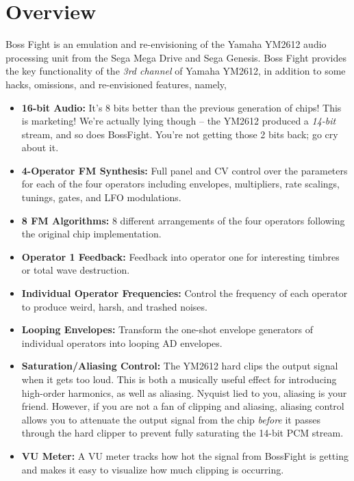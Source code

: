 \documentclass[12pt,letter]{article}
\begin{document}


\section*{Overview}

Boss Fight is an emulation and re-envisioning of the Yamaha YM2612 audio processing unit from the Sega Mega Drive and Sega Genesis. Boss Fight provides the key functionality of the \textit{3rd channel} of Yamaha YM2612, in addition to some hacks, omissions, and re-envisioned features, namely,
\begin{itemize}
  \item \textbf{16-bit Audio:} It's 8 bits better than the previous generation of chips! This is marketing! We're actually lying though -- the YM2612 produced a \textit{14-bit} stream, and so does BossFight. You're not getting those 2 bits back; go cry about it.
  \item \textbf{4-Operator FM Synthesis:} Full panel and CV control over the parameters for each of the four operators including envelopes, multipliers, rate scalings, tunings, gates, and LFO modulations.
  \item \textbf{8 FM Algorithms:} 8 different arrangements of the four operators following the original chip implementation.
  \item \textbf{Operator 1 Feedback:} Feedback into operator one for interesting timbres or total wave destruction.
  \item \textbf{Individual Operator Frequencies:} Control the frequency of each operator to produce weird, harsh, and trashed noises.
  \item \textbf{Looping Envelopes:} Transform the one-shot envelope generators of individual operators into looping AD envelopes.
  \item \textbf{Saturation/Aliasing Control:} The YM2612 hard clips the output signal when it gets too loud. This is both a musically useful effect for introducing high-order harmonics, as well as aliasing. Nyquist lied to you, aliasing is your friend. However, if you are not a fan of clipping and aliasing, aliasing control allows you to attenuate the output signal from the chip \textit{before} it passes through the hard clipper to prevent fully saturating the 14-bit PCM stream.
  \item \textbf{VU Meter:} A VU meter tracks how hot the signal from BossFight is getting and makes it easy to visualize how much clipping is occurring.

\end{itemize}
\end{document}
